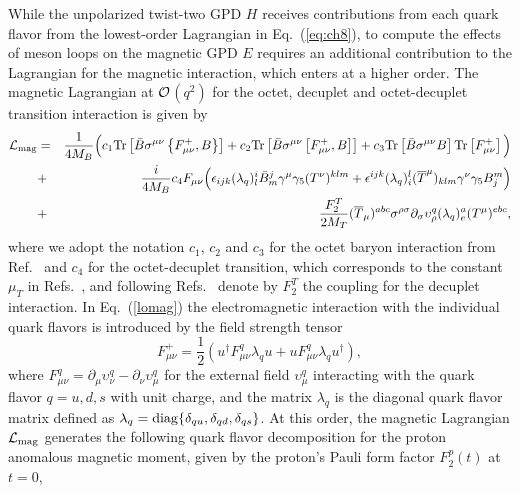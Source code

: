 \documentclass[preprintnumbers,prd,superscriptaddress,preprint]{revtex4-1}
\begin{document}
While the unpolarized twist-two GPD $H$ receives contributions from each quark flavor from the lowest-order Lagrangian in Eq.~(\ref{eq:ch8}), to compute the effects of meson loops on the magnetic GPD $E$ requires an additional contribution to the Lagrangian for the magnetic interaction, which enters at a higher order.
%
The magnetic Lagrangian at ${\cal O}$$(q^2)$ for the octet, decuplet and octet-decuplet transition interaction is given by~\cite{He:2017viu, He:2018eyz, Yang:2020rpi, Jones:1972ky, Geng:2009ys}
%
\begin{eqnarray}
\label{lomag}
{\cal L}_{\rm mag}
&=& \frac{1}{4 M_B} 
\Big( c_1{\rm Tr}\left[\bar{B} \sigma^{\mu\nu}
  \left\{F^+_{\mu\nu},B\right\}\right]+c_2{\rm Tr}\left[\bar{B}
  \sigma^{\mu\nu} \left[F^+_{\mu\nu},B \right]\right]+c_3{\rm Tr}\left[\bar{B}
  \sigma^{\mu\nu}B \right]{\rm Tr}\left[F^+_{\mu\nu}\right]
\Big) \nonumber \\
&+&
\frac{i}{4 M_B} c_4 F_{\mu\nu}\Big(\epsilon_{ijk}(\lambda_q)^i_l\bar{B}^j_m\gamma^\mu\gamma_5(T^\nu)^{klm} 
+\epsilon^{ijk}(\lambda_q)^l_i(\overline{T}^\mu)_{klm}\gamma^\nu\gamma_5 B^m_j\Big)
  \nonumber \\
&+&
\frac{F_2^T}{2 M_T}
(\overline{T}_\mu)^{abc}\sigma^{\rho\sigma}\partial_{\sigma} \upsilon_\rho^q(\lambda_q)^a_e (T^\mu)^{ebc},
\end{eqnarray}
%
where we adopt the notation $c_1$, $c_2$ and $c_3$ for the octet baryon interaction from Ref.~\cite{Yang:2020rpi} and $c_4$ for the octet-decuplet transition, which corresponds to the constant $\mu_T$ in Refs.~\cite{He:2017viu, He:2018eyz}, and following Refs.~\cite{He:2017viu,He:2018eyz} denote by $F_2^T$ the coupling for the decuplet interaction.
In Eq.~(\ref{lomag}) the electromagnetic interaction with the individual quark flavors is introduced by the field strength tensor
%
\begin{equation}
F^+_{\mu\nu} = \frac12
\left(u^\dag F^q_{\mu\nu}\lambda_q u + u F^q_{\mu\nu}\lambda_q u^\dag\right),
\end{equation}
%
where $F^q_{\mu\nu} = \partial_\mu \upsilon^q_\nu-\partial_\nu \upsilon^q_\mu$ for the external field $\upsilon^q_\mu$ interacting with the quark flavor $q=u,d,s$ with unit charge, and the matrix $\lambda_q$ is the diagonal quark flavor matrix defined as
\mbox{$\lambda_q = {\rm diag}\{\delta_{qu},\delta_{qd},\delta_{qs}\}$}.
At this order, the magnetic Lagrangian ${\cal L}_{\rm mag}$ generates the following quark flavor decomposition for the proton anomalous magnetic moment, given by the proton's Pauli form factor $F_2^p(t)$ at $t=0$,
$$
\end{document}
